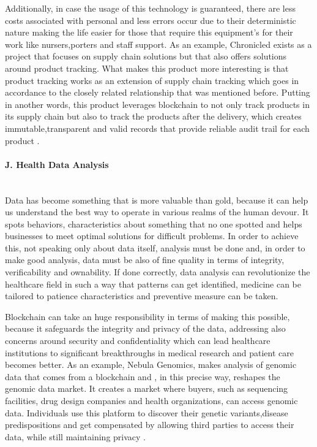 Additionally, in case the usage of this technology is guaranteed, there are less costs associated with personal and less errors occur due 
to their deterministic nature making the life easier for those that require this equipment's for their work like nursers,porters and staff 
support.
As an example, Chronicled exists as a project that focuses on supply chain solutions but that also offers solutions around product tracking. 
What makes this product more interesting is that product tracking works as an extension of supply chain tracking which goes in accordance to 
the closely related relationship that was mentioned before. Putting in another words, this product leverages blockchain to not only track 
products in its supply chain but also to track the products after the delivery, which creates immutable,transparent and valid records that 
provide reliable audit trail for each product \cite{chronicled}.

\paragraph{J. Health Data Analysis} \mbox{}\\
Data has become something that is more valuable than gold, because it can help us understand the best way to operate in various realms 
of the human devour. It spots behaviors, characteristics about something that no one spotted and helps businesses to meet optimal solutions 
for difficult problems. In order to achieve this, not speaking only about data itself, analysis must be done and, in order to make good 
analysis, data must be also of fine quality in terms of integrity, verificability and ownability. 
If done correctly, data analysis can revolutionize the healthcare field in such a way that patterns can get identified, medicine can be 
tailored to patience characteristics and preventive measure can be taken. 

Blockchain can take an huge responsibility in terms of making this possible, because it safeguards the integrity and privacy of the data, 
addressing also concerns around security and confidentiality which can lead healthcare institutions to significant breakthroughs in medical 
research and patient care becomes better.
As an example, Nebula Genomics, makes analysis of genomic data that comes from a blockchain and , in this precise way, reshapes the 
genomic data market. It creates a market where buyers, such as sequencing facilities, drug design companies and health organizations,
can access genomic data. Individuals use this platform to discover their genetic variants,disease predispositions and get compensated by 
allowing third parties to access their data, while still maintaining privacy \cite{potential-blockchain-tech}.